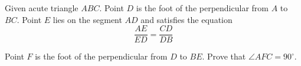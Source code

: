 Given acute triangle $ABC$. Point $D$ is the foot of the perpendicular from $A$ to $BC$. Point $E$ lies on the segment $AD$ and satisfies the equation\[\frac{AE}{ED}=\frac{CD}{DB}\]

Point $F$ is the foot of the perpendicular from $D$ to $BE$. Prove that $\angle AFC=90^{\circ}$.